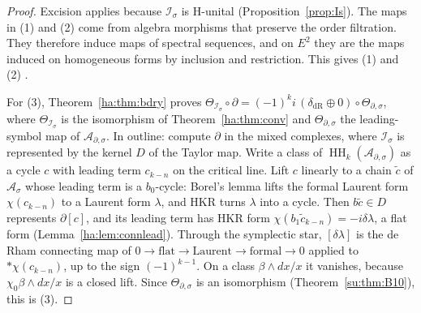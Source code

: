 \documentclass[11pt,oneside,reqno]{article}
\DeclareMathOperator{\HH}{HH}
\newcommand{\Is}{\mathcal I_\sigma}
\newcommand{\As}{\mathcal A_\sigma}
\newcommand{\Ads}{\mathcal A_{\partial,\sigma}}
\theoremstyle{plain}
\theoremstyle{definition}
\theoremstyle{remark}
\begin{document}
\begin{proof}
Excision applies because \(\Is\) is H-unital (Proposition~\ref{prop:Is}).
The maps in (1) and (2) come from algebra morphisms that preserve the
order filtration. They therefore induce maps of spectral sequences, and on
\(E^2\) they are the maps induced on homogeneous forms by inclusion and
restriction. This gives (1) and (2) \cite[p.~14]{MN}.

For (3), Theorem~\ref{ha:thm:bdry} proves
\(\Theta_{\Is}\circ\partial=(-1)^ki\,(\delta_{\mathrm{dR}}\oplus0)\circ
\Theta_{\partial,\sigma}\), where \(\Theta_{\Is}\) is the isomorphism of
Theorem~\ref{ha:thm:conv} and \(\Theta_{\partial,\sigma}\) the leading-symbol
map of \(\Ads\). In outline: compute \(\partial\) in the mixed complexes,
where \(\Is\) is represented by the kernel \(D\) of the Taylor map. Write a
class of \(\HH_k(\Ads)\) as a cycle \(c\) with leading term \(c_{k-n}\)
on the critical line. Lift \(c\) linearly to a chain \(\tilde c\) of
\(\As\) whose leading term is a \(b_0\)-cycle: Borel's lemma lifts the
formal Laurent form \(\chi(c_{k-n})\) to a Laurent form \(\lambda\), and
HKR turns \(\lambda\) into a cycle. Then \(b\tilde c\in D\) represents
\(\partial[c]\), and its leading term has HKR form
\(\chi(b_1\tilde c_{k-n})=-i\delta\lambda\), a flat form
(Lemma~\ref{ha:lem:connlead}). Through the symplectic star,
\([\delta\lambda]\) is the de Rham connecting map of
\(0\to\text{flat}\to\text{Laurent}\to\text{formal}\to0\) applied to
\(*\chi(c_{k-n})\), up to the sign \((-1)^{k-1}\). On a class
\(\beta\wedge dx/x\) it vanishes, because \(\chi_0\beta\wedge dx/x\) is a
closed lift. Since \(\Theta_{\partial,\sigma}\) is an isomorphism
(Theorem~\ref{su:thm:B10}), this is (3).
\end{proof}
\end{document}
